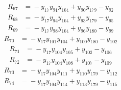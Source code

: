 \begin{align*}
R_{67} &={} -y_{17}y_{91}y_{104} +y_{90}y_{179} -y_{92}
\end{align*}
\begin{align*}
R_{68} &={} -y_{17}y_{94}y_{104} +y_{93}y_{179} -y_{95}
\end{align*}
\begin{align*}
R_{69} &={} -y_{17}y_{98}y_{104} +y_{96}y_{180} -y_{99}
\end{align*}
\begin{align*}
R_{70} &={} -y_{17}y_{101}y_{104} +y_{100}y_{180} -y_{102}
\end{align*}
\begin{align*}
R_{71} &={} -y_{17}y_{104}y_{105} +y_{103} -y_{106}
\end{align*}
\begin{align*}
R_{72} &={} -y_{17}y_{104}y_{108} +y_{107} -y_{109}
\end{align*}
\begin{align*}
R_{73} &={} -y_{17}y_{104}y_{111} +y_{110}y_{179} -y_{112}
\end{align*}
\begin{align*}
R_{74} &={} -y_{17}y_{104}y_{114} +y_{113}y_{179} -y_{115}
\end{align*}
